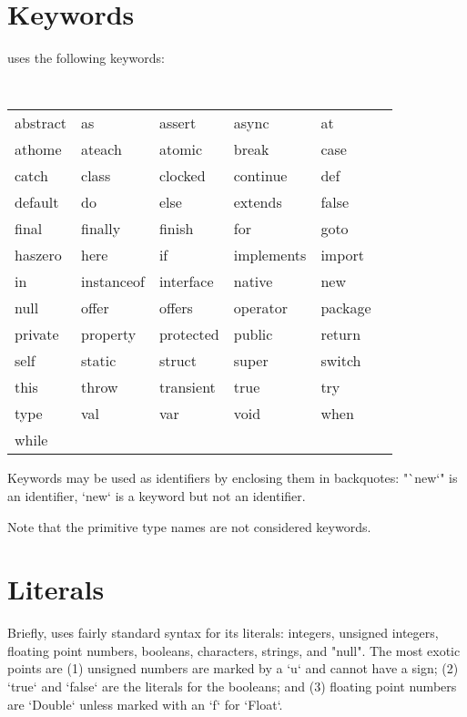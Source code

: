 \section{Keywords}
\Xten{} uses the following keywords:\\
{\tt 
\begin{tabular}{llllll}
    abstract &
    as&
    assert&
    async&
    at\\
    athome &
    ateach&
    atomic&
    break&
    case\\
    catch &
    class&
    clocked&
    continue&
    def\\
    default &
    do&
    else&
    extends&
    false\\
    final &
    finally&
    finish&
    for&
    goto\\
    haszero &
    here&
    if&
    implements&
    import\\
    in &
    instanceof&
    interface&
    native&
    new\\
    null &
    offer&
    offers&
    operator&
    package\\
    private &
    property&
    protected&
    public&
    return\\
    self &
    static&
    struct&
    super&
    switch\\
    this &
    throw&
    transient&
    true&
    try\\
    type &
    val&
    var&
    void&
    when\\
    while

\end{tabular}
}

Keywords may be used as identifiers by enclosing them in backquotes:
\xcd"`new`" is an identifier, \xcd`new` is a keyword but not an identifier.  

Note that the primitive type names are not considered keywords.

\section{Literals}\label{Literals}

Briefly, \XtenCurrVer{} uses fairly standard syntax for its literals:
integers, unsigned integers, floating point numbers, booleans, 
characters, strings, and \xcd"null".  The most exotic points are (1) unsigned
numbers are marked by a \xcd`u` and cannot have a sign; (2) \xcd`true` and
\xcd`false` are the literals for the booleans; and (3) floating point numbers
are \xcd`Double` unless marked with an \xcd`f` for \xcd`Float`. 

